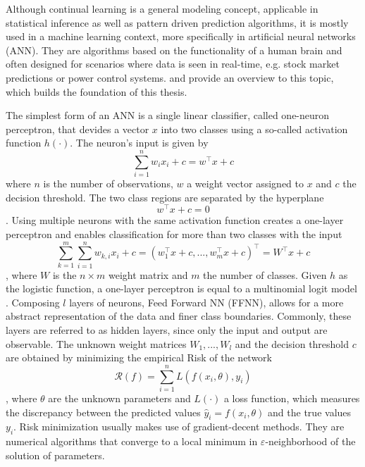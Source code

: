 Although continual learning is a general modeling concept, applicable in statistical inference as well as pattern driven prediction algorithms, it is mostly used in a machine learning context, more specifically in artificial neural networks (ANN). They are algorithms based on the functionality of a human brain and often designed for scenarios where data is seen in real-time, e.g. stock market predictions or power control systems. \citeauthor{Du_2019} \cite{Du_2019} and \citeauthor{Fahrmeir_2022} \cite{Fahrmeir_2022} provide an overview to this topic, which builds the foundation of this thesis. 

The simplest form of an ANN is a single linear classifier, called one-neuron perceptron, that devides a vector $x$ into two classes using a so-called activation function $h(\cdot)$. The neuron's input is given by
\begin{equation}
	\sum_{i = 1}^{n}{w_i x_i}+c = w^\top x+c
\end{equation}
where $n$ is the number of observations, $w$ a weight vector assigned to $x$ and $c$ the decision threshold. The two class regions are separated by the hyperplane%
\begin{equation}
	w^\top x + c = 0
\end{equation}.
Using multiple neurons with the same activation function creates a one-layer perceptron and enables classification for more than two classes with the input
\begin{equation}
	\sum_{k = 1}^{m}\sum_{i=1}^{n}w_{k,i}x_i + c = (w_1^\top x + c, ..., w_m^\top x + c)^\top = W^\top x + c
\end{equation} 
, where $W$ is the $n\times m$ weight matrix and $m$ the number of classes. Given $h$ as the logistic function, a one-layer perceptron is equal to a multinomial logit model%
. Composing $l$ layers of neurons, Feed Forward NN (FFNN), allows for a more abstract representation of the data and finer class boundaries. Commonly, these layers are referred to as hidden layers, since only the input and output are observable. The unknown weight matrices $W_1, ..., W_l$ and the decision threshold $c$ are obtained by minimizing the empirical Risk of the network
\begin{equation}
	\mathcal{R}(f) = \sum_{i=1}^{n} L(f(x_i, \theta), y_i)
\end{equation}
, where $\theta$ are the unknown parameters and $L(\cdot)$ a loss function, which measures the discrepancy between the predicted values $\hat{y}_i = f(x_i, \theta)$ and the true values $y_i$. Risk minimization usually makes use of gradient-decent methods. They are numerical algorithms that converge to a local minimum in $\varepsilon$-neighborhood of the solution of parameters.
